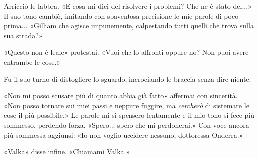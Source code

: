 Arricciò le labbra. «E cosa mi dici del risolvere i problemi? Che ne è
stato del...» Il suo tono cambiò, imitando con spaventosa precisione le
mie parole di poco prima... «Gilliam che agisce impunemente, calpestando
tutti quelli che trova sulla sua strada?»

«Questo non è leale» protestai. «Vuoi che lo affronti oppure no? Non
puoi avere entrambe le cose.»

Fu il suo turno di distogliere lo sguardo, incrociando le braccia senza
dire niente.

«Non mi posso scusare più di quanto abbia già fatto» affermai con
sincerità. «Non posso tornare sui miei passi e neppure fuggire, ma
\emph{cercherò} di sistemare le cose il più possibile.» Le parole mi si
spensero lentamente e il mio tono si fece più sommesso, perdendo forza.
«Spero... spero che mi perdonerai.» Con voce ancora più sommessa
aggiunsi: «Io non voglio uccidere nessuno, dottoressa Onderra.»

«Valka» disse infine. «Chiamami Valka.»


